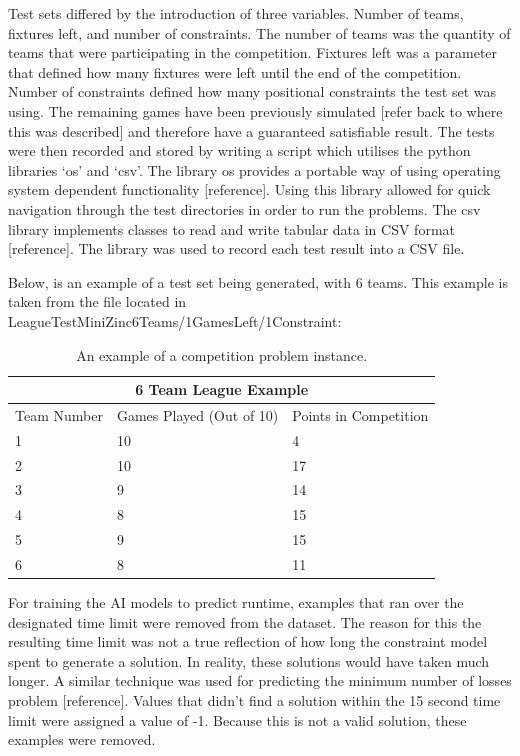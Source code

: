 \documentclass{article}
\begin{document}
	Test sets differed by the introduction of three variables. Number of teams, fixtures left, and number of constraints. The number of teams was the quantity of teams that were participating in the competition. Fixtures left was a parameter that defined how many fixtures were left until the end of the competition. Number of constraints defined how many positional constraints the test set was using. The remaining games have been previously simulated [refer back to where this was described] and therefore have a guaranteed satisfiable result. The tests were then recorded and stored by writing a script which utilises the python libraries ‘os’ and ‘csv’. The library os provides a portable way of using operating system dependent functionality [reference]. Using this library allowed for quick navigation through the test directories in order to run the problems. The csv library implements classes to read and write tabular data in CSV format [reference]. The library was used to record each test result into a CSV file.
	
	Below, is an example of a test set being generated, with 6 teams. This example is taken from the file located in LeagueTestMiniZinc6Teams/1GamesLeft/1Constraint:
	
	\begin{table}[h!]
		\centering
		\begin{tabular}{ |p{3cm}||p{3cm}| |p{3cm}| }
			\hline\multicolumn{3}{|c|}{6 Team League Example} \\
			\hline
			\hline
			Team Number & Games Played (Out of 10) & Points in Competition\\
			\hline
			1   & 10    & 4\\
			2&   10  & 17\\
			3 & 9 & 14\\
			4 & 8 & 15\\
			5&   9  & 15\\
			6& 8  & 11\\
			\hline
		\end{tabular}
		\caption{An example of a competition problem instance.}
	\end{table}
	
	For training the AI models to predict runtime, examples that ran over the designated time limit were removed from the dataset. The reason for this the resulting time limit was not a true reflection of how long the constraint model spent to generate a solution. In reality, these solutions would have taken much longer. A similar technique was used for predicting the minimum number of losses problem [reference]. Values that didn’t find a solution within the 15 second time limit were assigned a value of -1. Because this is not a valid solution, these examples were removed.
	
\end{document}
